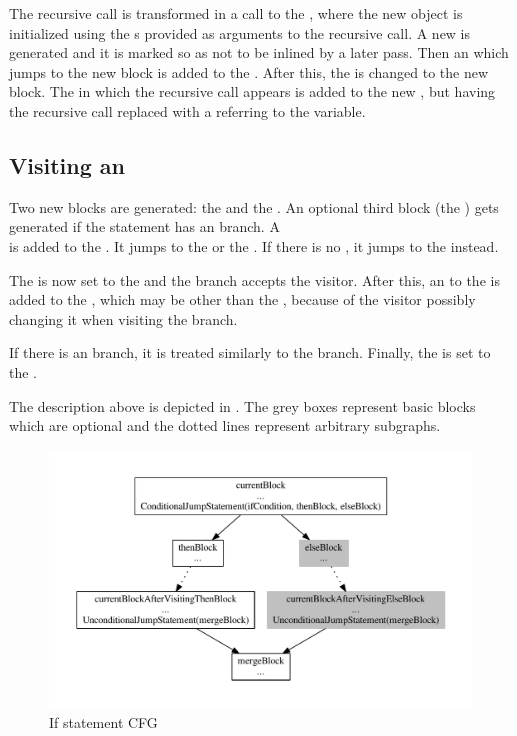 The recursive call is transformed in a  call to the , where the new  object is
initialized using the s provided as arguments to the recursive call. A new  is generated
and it is marked so as not to be inlined by a later pass. Then an  which jumps to the
new block is added to the . After this, the  is changed to the new block. The
 in which the recursive call appears is added to the new , but having the
recursive call replaced with a  referring to the  variable.

\subsection{Visiting an }

Two new blocks are generated: the  and the . An optional third block (the
) gets generated if the  statement has an  branch. A\\
 is added to the . It jumps to the  or the
. If there is no , it jumps to the  instead.

The  is now set to the  and the  branch accepts the visitor. After this,
an  to the  is added to the , which may be other
than the , because of the visitor possibly changing it when visiting the  branch.

If there is an  branch, it is treated similarly to the  branch. Finally, the 
is set to the .

The description above is depicted in . The grey boxes represent basic blocks
which are optional and the dotted lines represent arbitrary subgraphs.

\begin{figure}
    \centering
    \includegraphics[width=\textwidth]{src/graph/graph.pdf}
    \caption{If statement CFG\label{img:if-statement}}
\end{figure}

